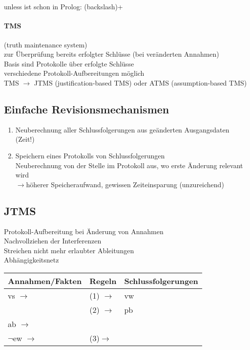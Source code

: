 \documentclass[a4paper,14pt]{article}
\begin{document}

\section{}

\glqq{}unless\grqq{} ist schon in Prolog: \glqq{}(backslash)+\grqq{}

\paragraph{TMS} (truth maintenance system)\\
zur Überprüfung bereits erfolgter Schlüsse (bei veränderten Annahmen)\\
Basis sind Protokolle über erfolgte Schlüsse\\
verschiedene Protokoll-Aufbereitungen möglich\\
TMS $\rightarrow$ JTMS (justification-based TMS) oder ATMS (assumption-based TMS)

\subsection{Einfache Revisionsmechanismen}
\begin{enumerate}
 \item Neuberechnung aller Schlussfolgerungen aus geänderten Ausgangsdaten (Zeit!)
 \item Speichern eines Protokolls von Schlussfolgerungen\\
	Neuberechnung von der Stelle im Protokoll aus, wo erste Änderung relevant wird
	\\$\rightarrow$höherer Speicheraufwand, gewissen Zeiteinsparung (unzureichend)
\end{enumerate}

\subsection{JTMS}

Protokoll-Aufbereitung bei Änderung von Annahmen\\
Nachvollziehen der Interferenzen\\
Streichen nicht mehr erlaubter Ableitungen\\
Abhängigkeitsnetz\\ %

\begin{tabular}{l|l|l}
Annahmen/Fakten			&	Regeln			&	Schlussfolgerungen	\\\hline
vs $\rightarrow$		&	(1) $\rightarrow$	&	vw			\\
				&	(2) $\rightarrow$	&	pb			\\
ab $\rightarrow$		&				&				\\
$\neg$ew $\rightarrow$		&	(3)$\rightarrow$	&				\\
\end{tabular}
\end{document}
